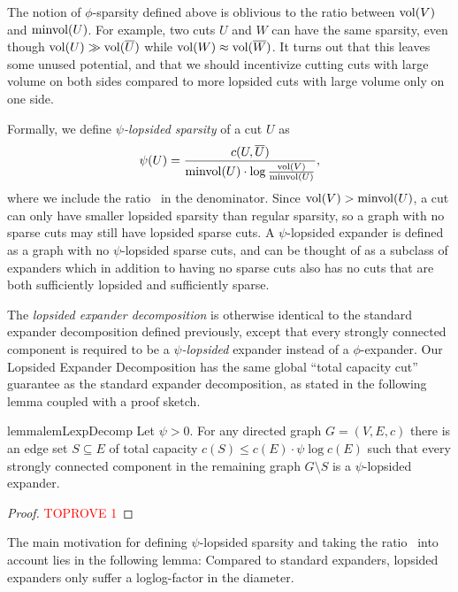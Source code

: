 The notion of $\phi$-sparsity defined above is oblivious to the ratio between $\operatorname{vol}(V)$ and $\operatorname{minvol}(U)$. For example, two cuts $U$ and $W$ can have the same sparsity, even though $\operatorname{vol}(U) \gg \operatorname{vol}(\overline U)$ while $\operatorname{vol}(W) \approx \operatorname{vol}(\overline W)$. It turns out that this leaves some unused potential, and that we should incentivize cutting cuts with large volume on both sides compared to more lopsided cuts with large volume only on one side.

Formally, we define \emph{$\psi$-lopsided sparsity} of a cut $U$ as 
\begin{align*}
	\psi(U) = \frac{c(U, \overline U)}{\operatorname{minvol}(U) \cdot \log \frac{\operatorname{vol}(V)}{\operatorname{minvol}(U)}},
\end{align*}
where we include the ratio~ in the denominator. Since $\operatorname{vol}(V)>\operatorname{minvol}(U)$, a cut can only have smaller lopsided sparsity than regular sparsity, so a graph with no sparse cuts may still have lopsided sparse cuts. A $\psi$-lopsided expander is defined as a graph with no $\psi$-lopsided sparse cuts, and can be thought of as a subclass of expanders which in addition to having no sparse cuts also has no cuts that are both sufficiently lopsided and sufficiently sparse.

The \emph{lopsided expander decomposition} is otherwise identical to the standard expander decomposition defined previously, except that every strongly connected component is required to be a \emph{$\psi$-lopsided} expander instead of a $\phi$-expander. Our Lopsided Expander Decomposition has the same global ``total capacity cut'' guarantee as the standard expander decomposition, as stated in the following lemma coupled with a proof sketch.

\begin{restatable}{lemma}{lemLexpDecomp} \label{lem:lexp-decomp}
	Let $\psi > 0$. For any directed graph $G = (V, E, c)$ there is an edge set $S \subseteq E$ of total capacity $c(S) \leq c(E) \cdot \psi \log c(E)$ such that every strongly connected component in the remaining graph $G \setminus S$ is a $\psi$-lopsided expander.
\end{restatable}

\begin{proof}\textcolor{red}{TOPROVE 1}\end{proof}

The main motivation for defining $\psi$-lopsided sparsity and taking the ratio~ into account lies in the following lemma: Compared to standard expanders, lopsided expanders only suffer a loglog-factor in the diameter.

